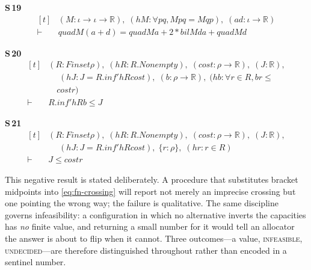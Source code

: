 \noindent\textbf{S\,19}\quad{}
{\footnotesize\[ \begin{aligned}[t]
&(\mathit{M} : \iota \to \iota \to \mathbb{R} ),\; (\mathit{hM} : \forall \mathit{p} \mathit{q}, \mathit{M} \mathit{p} \mathit{q} = \mathit{M} \mathit{q} \mathit{p}),\; (\mathit{a} \mathit{d} : \iota \to \mathbb{R} )\\
\vdash\;&\mathit{quad} \mathit{M} (\mathit{a} + \mathit{d}) = \mathit{quad} \mathit{M} \mathit{a} + 2 * \mathit{bil} \mathit{M} \mathit{d} \mathit{a} + \mathit{quad} \mathit{M} \mathit{d}
\end{aligned} \]}

\noindent\textbf{S\,20}\quad{}
{\footnotesize\[ \begin{aligned}[t]
&(\mathit{R} : \mathit{Finset} \rho ),\; (\mathit{hR} : \mathit{R}.\mathit{Nonempty}),\; (\mathit{cost} : \rho \to \mathbb{R} ),\; (\mathit{J} : \mathbb{R} ),\\
&\quad \; (\mathit{hJ} : \mathit{J} = \mathit{R}.\mathit{inf'} \mathit{hR} \mathit{cost}),\; (\mathit{b} : \rho \to \mathbb{R} ),\; (\mathit{hb} : \forall \mathit{r} \in \mathit{R}, \mathit{b} \mathit{r} \leq\\
&\quad \mathit{cost} \mathit{r})\\
\vdash\;&\mathit{R}.\mathit{inf'} \mathit{hR} \mathit{b} \leq \mathit{J}
\end{aligned} \]}

\noindent\textbf{S\,21}\quad{}
{\footnotesize\[ \begin{aligned}[t]
&(\mathit{R} : \mathit{Finset} \rho ),\; (\mathit{hR} : \mathit{R}.\mathit{Nonempty}),\; (\mathit{cost} : \rho \to \mathbb{R} ),\; (\mathit{J} : \mathbb{R} ),\\
&\quad \; (\mathit{hJ} : \mathit{J} = \mathit{R}.\mathit{inf'} \mathit{hR} \mathit{cost}),\; \{ \mathit{r} : \rho \},\; (\mathit{hr} : \mathit{r} \in \mathit{R})\\
\vdash\;&\mathit{J} \leq \mathit{cost} \mathit{r}
\end{aligned} \]}


This negative result is stated deliberately. A procedure that substitutes bracket midpoints
into \eqref{eq:fn-crossing} will report not merely an imprecise crossing but one pointing the
wrong way; the failure is qualitative. The same discipline governs infeasibility: a
configuration in which no alternative inverts the capacities has \emph{no} finite value, and
returning a small number for it would tell an allocator the answer is about to flip when it
cannot. Three outcomes---a value, \textsc{infeasible}, \textsc{undecided}---are therefore
distinguished throughout rather than encoded in a sentinel number.

